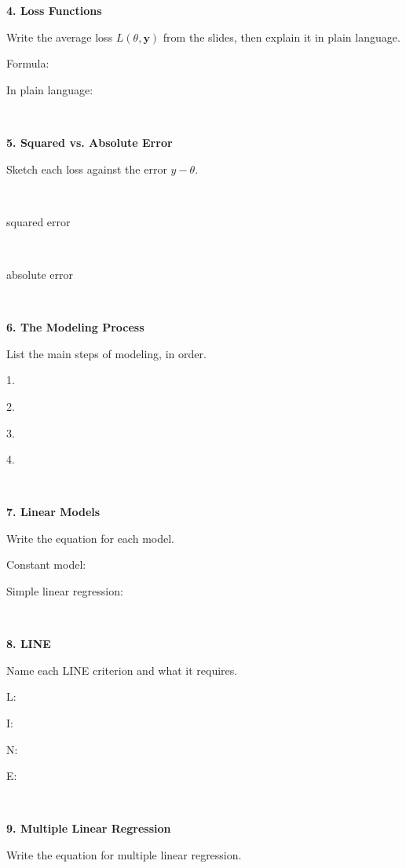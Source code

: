 \documentclass[11pt]{article}
\newcommand{\blankspace}[1]{%
  \vspace{0.3em}
  \begin{minipage}[t][#1][t]{\linewidth}
  \end{minipage}
  \vspace{0.3em}
}
\newcommand{\guidedopen}[4]{%
  \noindent\textbf{#1}\\[0.18em]
  \noindent
  \begin{minipage}[t]{0.485\textwidth}
    #2
    \blankspace{#3}
  \end{minipage}
  \hfill
  \begin{minipage}[t]{0.485\textwidth}
    \blankspace{#4}
  \end{minipage}
  \\[0.4em]
}
\newcommand{\axespanel}[3]{%
  \begin{minipage}[t]{\dimexpr#1+2\fboxsep+2\fboxrule\relax}
    \framebox[#1][c]{\rule{0pt}{#2}%
      \makebox[0pt][c]{\textcolor{black!25}{\rule{0.6pt}{#2}}}%
      \makebox[0pt][c]{\textcolor{black!25}{\raisebox{\dimexpr#2/6\relax}{\rule{#1}{0.6pt}}}}}%
    \\[0.25em]{\centering\small #3\par}%
  \end{minipage}%
}
\begin{document}
\vfill

\guidedopen{4. Loss Functions}{
Write the average loss $L(\theta, \mathbf{y})$ from the slides, then explain it in plain language.

\vspace{0.5em}
Formula:
\vspace{1.2cm}

In plain language:
}{1.3cm}{4.4cm}

\vfill

\newpage

\guidedopen{5. Squared vs. Absolute Error}{
Sketch each loss against the error $y - \theta$.

\vspace{0.45em}

\noindent
\axespanel{3.7cm}{2.7cm}{squared error}\hfill
\axespanel{3.7cm}{2.7cm}{absolute error}
}{0.2cm}{3.8cm}

\vfill

\guidedopen{6. The Modeling Process}{
List the main steps of modeling, in order.

\vspace{0.5em}
1.
\vspace{0.6cm}

2.
\vspace{0.6cm}

3.
\vspace{0.6cm}

4.
}{0.6cm}{4.0cm}

\vfill

\guidedopen{7. Linear Models}{
Write the equation for each model.

\vspace{0.5em}
Constant model:
\vspace{0.8cm}

Simple linear regression:
}{0.8cm}{2.4cm}

\vfill

\guidedopen{8. LINE}{
Name each LINE criterion and what it requires.

\vspace{0.5em}
L:
\vspace{0.7cm}

I:
\vspace{0.7cm}

N:
\vspace{0.7cm}

E:
}{0.7cm}{4.2cm}

\vfill

\guidedopen{9. Multiple Linear Regression}{
Write the equation for multiple linear regression.
}{0.8cm}{1.4cm}

\vfill
\end{document}
